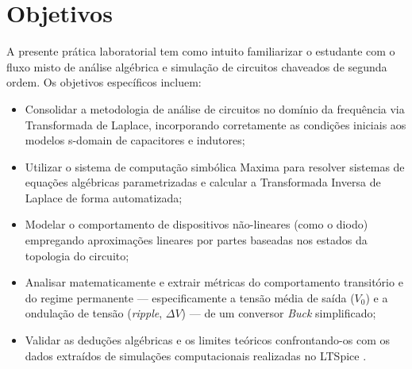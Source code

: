 \section{Objetivos}

A presente prática laboratorial tem como intuito familiarizar o estudante com o fluxo misto de análise algébrica e simulação de circuitos chaveados de segunda ordem. Os objetivos específicos incluem:

\begin{itemize}
	\item Consolidar a metodologia de análise de circuitos no domínio da frequência via Transformada de Laplace, incorporando corretamente as condições iniciais aos modelos s-domain de capacitores e indutores;
	\item Utilizar o sistema de computação simbólica Maxima \cite{maxima} para resolver sistemas de equações algébricas parametrizadas e calcular a Transformada Inversa de Laplace de forma automatizada;
	\item Modelar o comportamento de dispositivos não-lineares (como o diodo) empregando aproximações lineares por partes baseadas nos estados da topologia do circuito;
	\item Analisar matematicamente e extrair métricas do comportamento transitório e do regime permanente — especificamente a tensão média de saída ($V_0$) e a ondulação de tensão (\textit{ripple}, $\Delta V$) — de um conversor \textit{Buck} simplificado;
	\item Validar as deduções algébricas e os limites teóricos confrontando-os com os dados extraídos de simulações computacionais realizadas no LTSpice \cite{ltspice}.
\end{itemize}